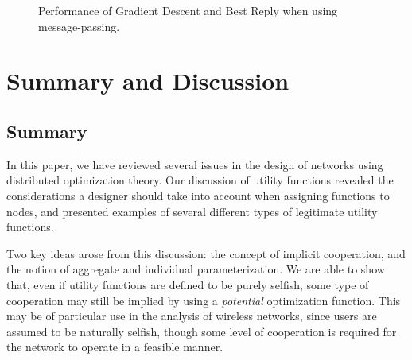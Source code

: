 \documentclass[11pt]{IEEEtran}
\theoremstyle{definition}
\begin{document}
\begin{figure}[htp]
\begin{center}
  \caption{Performance of Gradient Descent and Best Reply when using
  message-passing.}
  \label{fig:GDMP}
\end{center}
\end{figure}


\section{Summary and Discussion}

\subsection{Summary}

In this paper, we have reviewed several issues in the design of networks using distributed optimization theory.  Our discussion of utility
functions revealed the considerations a designer should take into account when assigning functions to nodes, and presented examples of several different types of legitimate utility functions.

Two key ideas arose from this discussion: the concept of implicit cooperation, and the notion of aggregate and individual parameterization. We are able to show that, even if utility functions are defined to be purely selfish, some type of cooperation may still be implied by using a \emph{potential} optimization function. This may be of particular use in the analysis of wireless networks, since users are assumed to be naturally selfish, though some level of cooperation is required for the network to operate in a feasible manner.
\end{document}

